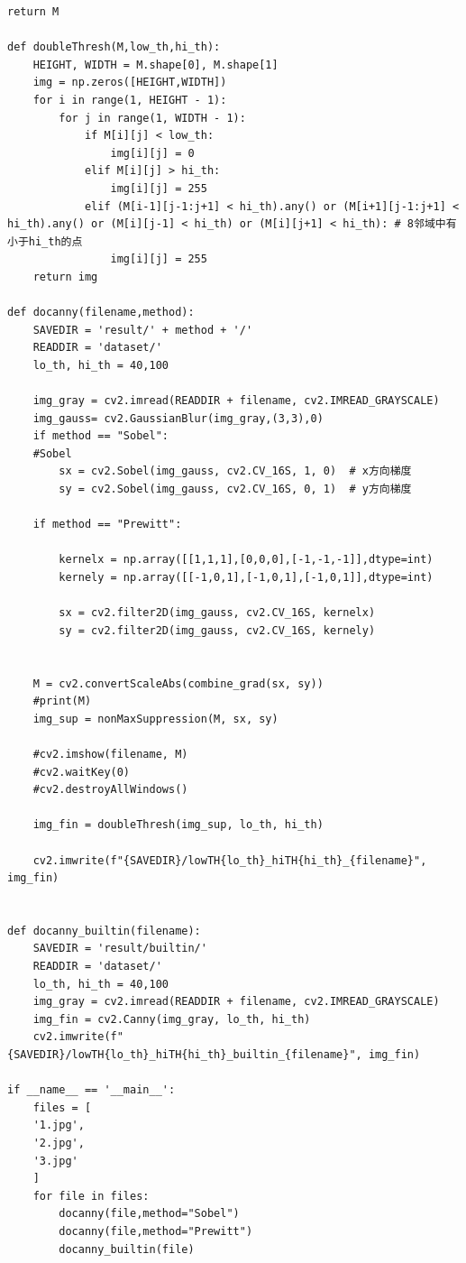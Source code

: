 \documentclass[12pt,a4paper]{article}
\begin{document}
\begin{lstlisting}[style=py]
    return M

def doubleThresh(M,low_th,hi_th):
    HEIGHT, WIDTH = M.shape[0], M.shape[1]
    img = np.zeros([HEIGHT,WIDTH])
    for i in range(1, HEIGHT - 1):
        for j in range(1, WIDTH - 1):
            if M[i][j] < low_th:
                img[i][j] = 0
            elif M[i][j] > hi_th:
                img[i][j] = 255
            elif (M[i-1][j-1:j+1] < hi_th).any() or (M[i+1][j-1:j+1] < hi_th).any() or (M[i][j-1] < hi_th) or (M[i][j+1] < hi_th): # 8邻域中有小于hi_th的点
                img[i][j] = 255
    return img

def docanny(filename,method):
    SAVEDIR = 'result/' + method + '/'
    READDIR = 'dataset/'
    lo_th, hi_th = 40,100

    img_gray = cv2.imread(READDIR + filename, cv2.IMREAD_GRAYSCALE)
    img_gauss= cv2.GaussianBlur(img_gray,(3,3),0)
    if method == "Sobel":
    #Sobel
        sx = cv2.Sobel(img_gauss, cv2.CV_16S, 1, 0)  # x方向梯度
        sy = cv2.Sobel(img_gauss, cv2.CV_16S, 0, 1)  # y方向梯度
    
    if method == "Prewitt":

        kernelx = np.array([[1,1,1],[0,0,0],[-1,-1,-1]],dtype=int)
        kernely = np.array([[-1,0,1],[-1,0,1],[-1,0,1]],dtype=int)

        sx = cv2.filter2D(img_gauss, cv2.CV_16S, kernelx)
        sy = cv2.filter2D(img_gauss, cv2.CV_16S, kernely)
       
    
    M = cv2.convertScaleAbs(combine_grad(sx, sy))
    #print(M)
    img_sup = nonMaxSuppression(M, sx, sy)
    
    #cv2.imshow(filename, M)
    #cv2.waitKey(0)
    #cv2.destroyAllWindows()
    
    img_fin = doubleThresh(img_sup, lo_th, hi_th)

    cv2.imwrite(f"{SAVEDIR}/lowTH{lo_th}_hiTH{hi_th}_{filename}", img_fin)
 

def docanny_builtin(filename):
    SAVEDIR = 'result/builtin/'
    READDIR = 'dataset/'
    lo_th, hi_th = 40,100
    img_gray = cv2.imread(READDIR + filename, cv2.IMREAD_GRAYSCALE)
    img_fin = cv2.Canny(img_gray, lo_th, hi_th)
    cv2.imwrite(f"{SAVEDIR}/lowTH{lo_th}_hiTH{hi_th}_builtin_{filename}", img_fin)

if __name__ == '__main__':
    files = [
    '1.jpg',
    '2.jpg',
    '3.jpg'
    ] 
    for file in files:
        docanny(file,method="Sobel")  
        docanny(file,method="Prewitt")  
        docanny_builtin(file)




\end{lstlisting}
\end{document}
